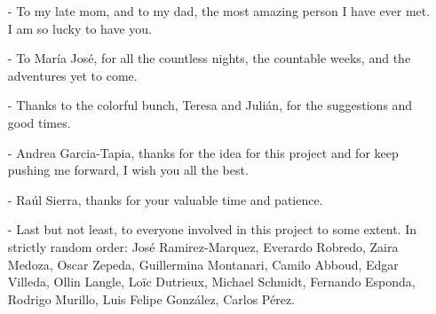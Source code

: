 \begin{acknowledgments}
\begin{itemize}
\setlength{\itemsep}{0pt}
\item[-] To my late mom, and to my dad, the most amazing person I have ever met. I am so lucky to have you.
\item[-] To Mar\'ia Jos\'e, for all the countless nights, the countable weeks, and the adventures yet to come.
\item[-] Thanks to the colorful bunch, Teresa and Juli\'an, for the suggestions and good times.
\item[-] Andrea Garcia-Tapia, thanks for the idea for this project and for keep pushing me forward, I wish you all the best.
\item[-] Ra\'ul Sierra, thanks for your valuable time and patience.
\item[-] Last but not least, to everyone involved in this project to some extent. In strictly random order: Jos\'e Ramirez-Marquez, Everardo Robredo, Zaira Medoza, Oscar Zepeda, Guillermina Montanari, Camilo Abboud, Edgar Villeda, Ollin Langle, Lo\"{i}c Dutrieux, Michael Schmidt, Fernando Esponda, Rodrigo Murillo, Luis Felipe Gonz\'alez, Carlos P\'erez.
\end{itemize}
\end{acknowledgments}
